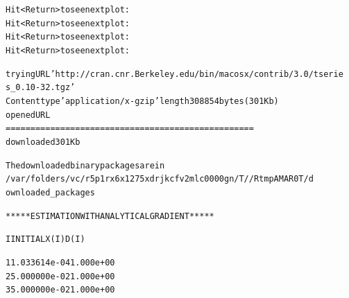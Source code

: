 \documentclass[letterpaper,10pt,english]{/Users/edwsurewin/anaconda/lib/python2.7/site-packages/sphinx/texinputs/sphinxhowto}
\newenvironment{InvisibleVerbatim}
        {\begin{mdframed}[leftmargin=0.1\linewidth,innerleftmargin=3pt,innerrightmargin=3pt, userdefinedwidth=1\linewidth, linewidth=0pt, linecolor=white, usetwoside=false]}
        {\end{mdframed}}
\begin{document}
        

            
                \begin{InvisibleVerbatim}
                \vspace{-0.5\baselineskip}
\begin{alltt}Hit <Return> to see next plot:
Hit <Return> to see next plot:
Hit <Return> to see next plot:
Hit <Return> to see next plot:
\end{alltt}

            \end{InvisibleVerbatim}
            
                \begin{InvisibleVerbatim}
                \vspace{-0.5\baselineskip}
\begin{alltt}trying URL 'http://cran.cnr.Berkeley.edu/bin/macosx/contrib/3.0/tserie
s\_0.10-32.tgz'
Content type 'application/x-gzip' length 308854 bytes (301 Kb)
opened URL
==================================================
downloaded 301 Kb


The downloaded binary packages are in
        /var/folders/vc/r5p1rx6x1275xdrjkcfv2mlc0000gn/T//RtmpAMAR0T/d
ownloaded\_packages

 ***** ESTIMATION WITH ANALYTICAL GRADIENT *****


     I     INITIAL X(I)        D(I)

     1     1.033614e-04     1.000e+00
     2     5.000000e-02     1.000e+00
     3     5.000000e-02     1.000e+00


\end{alltt}
\end{InvisibleVerbatim}
\end{document}
